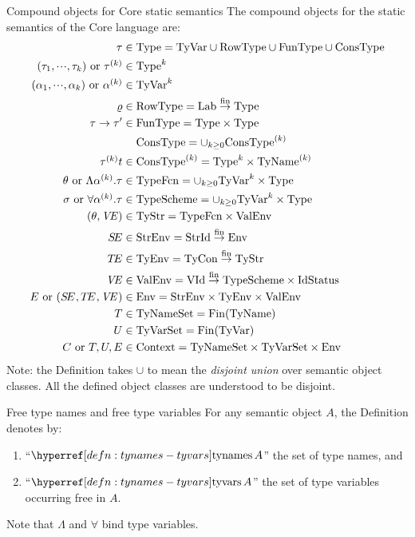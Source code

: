 \begin{clause}{Compound objects for Core static semantics}
The compound objects for the static semantics of the Core language are:
\begin{align*}
        \tau    & \in \Type = \TyVar\cup\RowType\cup\FunType\cup\ConsType\\
 \longtauk\ {\rm or}\ \tauk
                & \in  \Type^k\\
 \longalphak\ {\rm or}\ \alphak
                & \in  \TyVar^k\\
 \varrho        & \in  \RowType = \finfun{\Lab}{\Type} \\
 \tau\rightarrow\tau'
                & \in  \FunType = \Type\times\Type \\
                & \mathrel{\phantom{\in}} \ConsType = \cup_{k\geq 0}\ConsType^{(k)}\\
        \tauk t & \in  \ConsType^{(k)} = \Type^k\times\TyNamesk  \\
\typefcn\ {\rm or}\ \typefcnk
                & \in  \TypeFcn = \cup_{k\geq 0}\TyVar^k\times\Type\\
\tych\ {\rm or}\ \longtych
                & \in  \TypeScheme = \cup_{k\geq 0}\TyVar^k\times\Type\\
(\theta,\VE)    & \in  \TyStr = \TypeFcn\times\ValEnv\\
\SE             & \in  \StrEnv = \finfun{\StrId}{\Env}\\
\TE             & \in  \TyEnv = \finfun{\TyCon}{\TyStr}\\
\VE             & \in  \ValEnv = \finfun{\VId}{\TypeScheme\times\IdStatus}\\
\E\ {\rm or}\ \newlongE{}
                & \in  \Env = \StrEnv\times\TyEnv\times\ValEnv\\
\T              & \in  \TyNameSets = \Fin(\TyNames)\\
\U              & \in  \TyVarSet = \Fin(\TyVar)\\
\C\ {\rm or}\ \T,\U,\E   & \in  \Context = \TyNameSets\times\TyVarSet\times\Env
\end{align*}
Note: the Definition takes $\cup$ to mean the \emph{disjoint union} over
semantic object classes. All the defined object classes are understood
to be disjoint.
\end{clause}

\begin{definition}{Free type names and free type variables}\label{defn:tynames-tyvars}
For any semantic object $A$, the Definition denotes by:
\begin{enumerate}
\item ``$\TyNamesFcn A$'' the set of type names, and
\item ``$\TyVarsFcn A$'' the set of type variables occurring free in $A$.
\end{enumerate}
Note that $\Lambda$ and $\forall$ bind type variables.
\end{definition}

